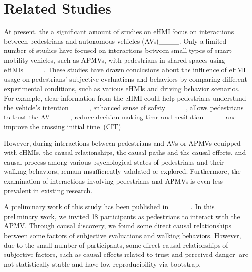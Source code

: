 \section{Related Studies}
At present, the a significant amount of studies on eHMI focus on interactions between pedestrians and autonomous vehicles (AVs)____. 
Only a limited number of studies have focused on interactions between small types of smart mobility vehicles, such as APMVs, with pedestrians in shared spaces using eHMIs____.
These studies have drawn conclusions about the influence of eHMI usage on pedestrians' subjective evaluations and behaviors by comparing different experimental conditions, such as various eHMIs and driving behavior scenarios.
For example, clear information from the eHMI could help pedestrians understand the vehicle's intention____, enhanced sense of safety____, allows pedestrians to trust the AV____, reduce decision-making time and hesitation____ and improve the crossing initial time~(CIT)____.



However, during interactions between pedestrians and AVs or APMVs equipped with eHMIs, the causal relationships, \ie the causal paths and the causal effects,  and causal process among various psychological states of pedestrians and their walking behaviors, remain insufficiently validated or explored.
Furthermore, the examination of interactions involving pedestrians and APMVs is even less prevalent in existing research.


A preliminary work of this study has been published in ____.
In this preliminary work, we invited 18 participants as pedestrians to interact with the APMV. 
Through causal discovery, we found some direct causal relationships between some factors of subjective evaluations and walking behaviors.
However, due to the small number of participants, some direct causal relationships of subjective factors, such as causal effects related to trust and perceived danger, are not statistically stable and have low reproducibility via bootstrap.